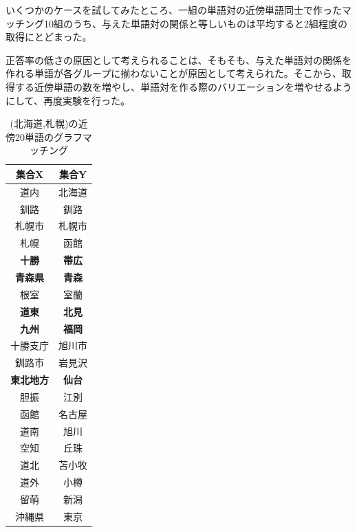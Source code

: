 いくつかのケースを試してみたところ、一組の単語対の近傍単語同士で作ったマッチング10組のうち、与えた単語対の関係と等しいものは平均すると2組程度の取得にとどまった。

正答率の低さの原因として考えられることは、そもそも、与えた単語対の関係を作れる単語が各グループに揃わないことが原因として考えられた。そこから、取得する近傍単語の数を増やし、単語対を作る際のバリエーションを増やせるようにして、再度実験を行った。

\begin{table}[h]
  \begin{minipage}[t]{.45\textwidth}
    \caption[(北海道,札幌)の近傍20単語のグラフマッチング]{(北海道,札幌)の近傍20単語のグラフマッチング}
    \label{}
    \begin{center}
      \begin{tabular}{|c||c|} \hline
        集合X & 集合Y \\ \hline \hline
        道内 & 北海道 \\
        釧路 & 釧路 \\
        札幌市 & 札幌市 \\
        札幌 & 函館 \\
        \textbf{十勝} & \textbf{帯広} \\
        \textbf{青森県} & \textbf{青森} \\
        根室 & 室蘭 \\
        \textbf{道東} & \textbf{北見} \\
        \textbf{九州} & \textbf{福岡} \\
        十勝支庁 & 旭川市 \\ \hline
        釧路市 & 岩見沢 \\
        \textbf{東北地方} & \textbf{仙台} \\
        胆振 & 江別 \\
        函館 & 名古屋 \\
        道南 & 旭川 \\
        空知 & 丘珠 \\
        道北 & 苫小牧 \\
        道外 & 小樽 \\
        留萌 & 新潟 \\
        沖縄県 & 東京 \\ \hline
      \end{tabular}
    \end{center}
  \end{minipage}
  \hfill
  \begin{minipage}[t]{.45\textwidth}

\end{minipage}
\end{table}
